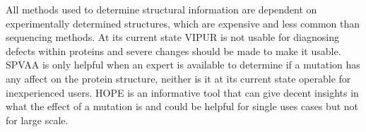 All methods used to determine structural information are dependent on experimentally determined structures, which are expensive and less common than sequencing methods. At its current state VIPUR is not usable for diagnosing defects within proteins and severe changes should be made to make it usable. SPVAA is only helpful when an expert is available to determine if a mutation has any affect on the protein structure, neither is it at its current state operable for inexperienced users. HOPE is an informative tool that can give decent insights in what the effect of a mutation is and could be helpful for single uses cases but not for large scale.